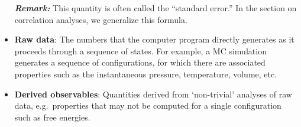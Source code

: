 \begin{itemize}
  

\smallskip
\textbf{\textit{Remark:}} This quantity is often called the ``standard error.''  In the section on correlation analyses, we generalize this formula.


  
\item {\bf Raw data}: The numbers that the computer program directly generates as it proceeds through a sequence of states.
For example, a MC simulation generates a sequence of configurations, for which there are associated properties such as the instantaneous pressure, temperature, volume, etc.
\label{def:raw_data}
\item {\bf Derived observables}: Quantities derived from `non-trivial' analyses of raw data, e.g.\ properties that may not be computed for a single configuration such as free energies.
  \label{def:deriv_obs}
  
  



\end{itemize}
